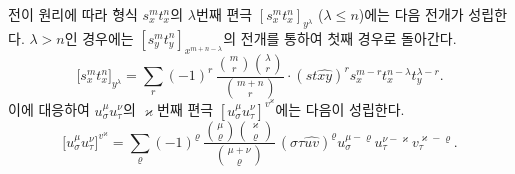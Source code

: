 
전이 원리에 따라 형식 $s_x^m t_x^n$의 $\lambda$번째 편극 $[s_x^m t_x^n]_{y^\lambda}$ ($\lambda\le n$)에는 다음 전개가 성립한다. $\lambda>n$인 경우에는 $[s_y^m t_y^n]_{x^{m+n-\lambda}}$의 전개를 통하여 첫째 경우로 돌아간다.
\[
\bigl[s_x^m t_x^n\bigr]_{y^\lambda}
=\sum_r (-1)^r\,
\frac{\binom{m}{r}\binom{\lambda}{r}}{\binom{m+n}{r}}\cdot
(st\widehat{xy})^r s_x^{m-r}t_x^{n-\lambda}t_y^{\lambda-r}.
\]
이에 대응하여 $u_\sigma^\mu u_\tau^\nu$의 $\varkappa$번째 편극 $[u_\sigma^\mu u_\tau^\nu]^{v^\varkappa}$에는 다음이 성립한다.
\[
\bigl[u_\sigma^\mu u_\tau^\nu\bigr]^{v^\varkappa}
=\sum_\varrho (-1)^\varrho\,
\frac{\binom{\mu}{\varrho}\binom{\varkappa}{\varrho}}{\binom{\mu+\nu}{\varrho}}\,
(\sigma\tau\widehat{uv})^\varrho u_\sigma^{\mu-\varrho}u_\tau^{\nu-\varkappa}v_\tau^{\varkappa-\varrho}.
\]

